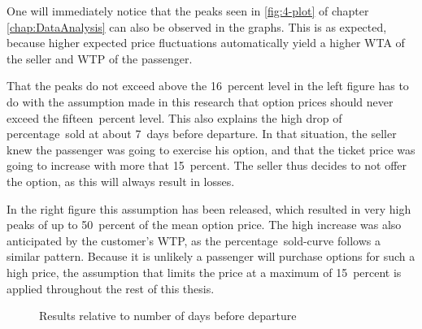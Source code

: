 One will immediately notice that the peaks seen in \autoref{fig:4-plot} of chapter \autoref{chap:DataAnalysis} can also be observed in the graphs. This is as expected, because higher expected price fluctuations automatically yield a higher WTA of the seller and WTP of the passenger.

That the peaks do not exceed above the 16~percent level in the left figure has to do with the assumption made in this research that option prices should never exceed the fifteen~percent level. This also explains the high drop of percentage~sold at about 7~days before departure. In that situation, the seller knew the passenger was going to exercise his option, and that the ticket price was going to increase with more that 15~percent. The seller thus decides to not offer the option, as this will always result in losses.

In the right figure this assumption has been released, which resulted in very high peaks of up to 50~percent of the mean option price. The high increase was also anticipated by the customer's WTP, as the percentage~sold-curve follows a similar pattern. Because it is unlikely a passenger will purchase options for such a high price, the assumption that limits the price at a maximum of 15~percent is applied throughout the rest of this thesis.


\begin{figure}
\centering
{}
\qquad
{}
\caption{Results relative to number of days before departure}
\label{fig:OptionPricesDBB}
\end{figure}


